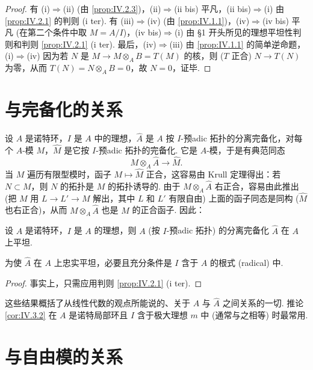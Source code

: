 \begin{proof}
有 (i)$\Rightarrow$(ii) (由 \ref{prop:IV.2.3})，(ii)$\Rightarrow$(ii bis) 平凡，(ii bis)$\Rightarrow$(i) 由 \ref{prop:IV.2.1} 的判则 (i ter). 有 (iii)$\Rightarrow$(iv) (由 \ref{prop:IV.1.1})，(iv)$\Rightarrow$(iv bis) 平凡 (在第二个条件中取 $M = A/I$)，(iv bis)$\Rightarrow$(i) 由 §1 开头所见的理想平坦性判则和判则 \ref{prop:IV.2.1} (i ter). 最后，(iv)$\Rightarrow$(iii) 由 \ref{prop:IV.1.1} 的简单逆命题，(i)$\Rightarrow$(iv) 因为若 $N$ 是 $M \to M \otimes_A B = T(M)$ 的核，则 ($T$ 正合) $N \to T(N)$ 为零，从而 $T(N) = N \otimes_A B = 0$，故 $N = 0$，证毕.
\end{proof}

\section{与完备化的关系}

设 $A$ 是诺特环，$I$ 是 $A$ 中的理想，$\widehat{A}$ 是 $A$ 按 $I$-预adic 拓扑的分离完备化，对每个 $A$-模 $M$，$\widehat{M}$ 是它按 $I$-预adic 拓扑的完备化. 它是 $A$-模，于是有典范同态
\[
M \otimes_A \widehat{A} \longrightarrow \widehat{M}.
\]
当 $M$ 遍历有限型模时，函子 $M \mapsto \widehat{M}$ 正合，这容易由 Krull 定理得出：若 $N \subset M$，则 $N$ 的拓扑是 $M$ 的拓扑诱导的. 由于 $M \otimes_A \widehat{A}$ 右正合，容易由此推出 (把 $M$ 用 $L \to L' \to M$ 解出，其中 $L$ 和 $L'$ 有限自由) 上面的函子同态是同构 ($\widehat{M}$ 也右正合)，从而 $M \otimes_A \widehat{A}$ 也是 $M$ 的正合函子. 因此：

\begin{proposition}\label{prop:IV.3.1}
设 $A$ 是诺特环，$I$ 是 $A$ 的理想，则 $A$ (按 $I$-预adic 拓扑) 的分离完备化 $\widehat{A}$ 在 $A$ 上平坦.
\end{proposition}

\begin{corollary}\label{cor:IV.3.2}
为使 $\widehat{A}$ 在 $A$ 上忠实平坦，必要且充分条件是 $I$ 含于 $A$ 的根式 (radical) 中.
\end{corollary}

\begin{proof}
事实上，只需应用判则 \ref{prop:IV.2.1} (i ter).
\end{proof}

这些结果概括了从线性代数的观点所能说的、关于 $A$ 与 $\widehat{A}$ 之间关系的一切. 推论 \ref{cor:IV.3.2} 在 $A$ 是诺特局部环且 $I$ 含于极大理想 $m$ 中 (通常与之相等) 时最常用.

\section{与自由模的关系}

